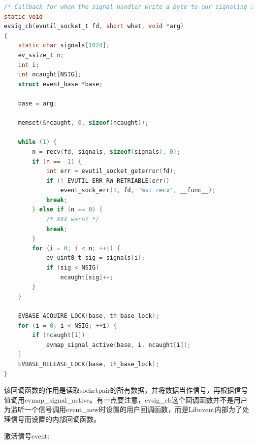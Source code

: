 \documentclass[11pt,a4paper]{article}
\begin{document}
\begin{lstlisting}[language=C]
/* Callback for when the signal handler write a byte to our signaling socket */
static void
evsig_cb(evutil_socket_t fd, short what, void *arg)
{
	static char signals[1024];
	ev_ssize_t n;
	int i;
	int ncaught[NSIG];
	struct event_base *base;

	base = arg;

	memset(&ncaught, 0, sizeof(ncaught));

	while (1) {
		n = recv(fd, signals, sizeof(signals), 0);
		if (n == -1) {
			int err = evutil_socket_geterror(fd);
			if (! EVUTIL_ERR_RW_RETRIABLE(err))
				event_sock_err(1, fd, "%s: recv", __func__);
			break;
		} else if (n == 0) {
			/* XXX warn? */
			break;
		}
		for (i = 0; i < n; ++i) {
			ev_uint8_t sig = signals[i];
			if (sig < NSIG)
				ncaught[sig]++;
		}
	}

	EVBASE_ACQUIRE_LOCK(base, th_base_lock);
	for (i = 0; i < NSIG; ++i) {
		if (ncaught[i])
			evmap_signal_active(base, i, ncaught[i]);
	}
	EVBASE_RELEASE_LOCK(base, th_base_lock);
}
\end{lstlisting}
该回调函数的作用是读取socketpair的所有数据，并将数据当作信号，再根据信号值调用evmap\_signal\_active。有一点要注意，evsig\_cb这个回调函数并不是用户为监听一个信号调用event\_new时设置的用户回调函数，而是Libevent内部为了处理信号而设置的内部回调函数。

激活信号event:
\end{document}
